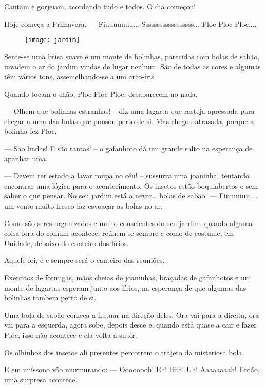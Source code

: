 Cantam e gorjeiam, acordando tudo e todos.
O dia começou!

Hoje começa a Primavera.
\bigbreak
— Fiuuuuuuu... Ssssssssssssssssss... Ploc Ploc Ploc....

\begin{figure}[h]
    \centering
    \texttt{[image: jardim]}
\end{figure}


Sente-se uma brisa suave e um monte de bolinhas, parecidas com bolas de sabão, invadem o ar do jardim vindas de lugar nenhum. São de todas as cores e algumas têm vários tons, assemelhando-se a um arco-íris.

Quando tocam o chão, Ploc Ploc Ploc, desaparecem no nada.

— Olhem que bolinhas estranhas! – diz uma lagarta que rasteja apressada para chegar a uma das bolas que pousou perto de si. Mas chegou atrasada, porque a bolinha fez Ploc.

— São lindas! E são tantas! – o gafanhoto dá um grande salto na esperança de apanhar uma.

— Devem ter estado a lavar roupa no céu! – sussurra uma joaninha, tentando encontrar uma lógica para o acontecimento.
\bigbreak
Os insetos estão boquiabertos e sem saber o que pensar. No seu jardim está a nevar… bolas de sabão.
\bigbreak
— Fiuuuuuu.... um vento muito fresco faz esvoaçar as bolas no ar.

Como são seres organizados e muito conscientes do seu jardim, quando alguma coisa fora do comum acontece, reúnem-se sempre e como de costume, em Unidade, debaixo do canteiro dos lírios.

Aquele foi, é e sempre será o canteiro das reuniões.

Exércitos de formigas, mãos cheias de joaninhas, braçadas de gafanhotos e um monte de lagartas esperam junto aos lírios, na esperança de que algumas das bolinhas tombem perto de si.

Uma bola de sabão começa a flutuar na direção deles. Ora vai para a direita, ora vai para a esquerda, agora sobe, depois desce e, quando está quase a cair e fazer Ploc, isso não acontece e ela volta a subir.

Os olhinhos dos insetos ali presentes percorrem o trajeto da misteriosa bola.

E em uníssono vão murmurando:
\bigbreak
— Oooooooh! Eh! Iiiih! Uh! Aaaaaaaah!
\bigbreak
Então, uma surpresa acontece.